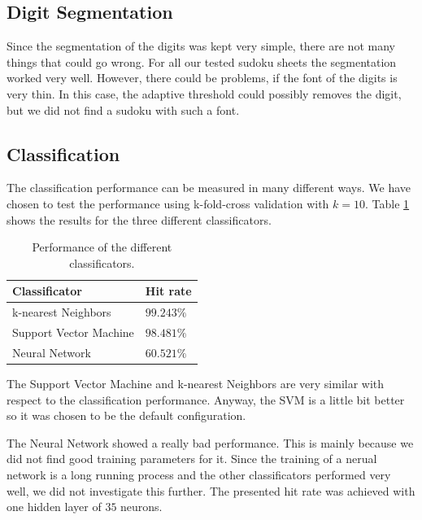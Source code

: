 \documentclass[
a4paper,     %
12pt         %
]{scrartcl}  %
\begin{document}
\subsection{Digit Segmentation}

\label{sec:class_perf}
 
Since the segmentation of the digits was kept very simple, there are not many things that could go
wrong. For all our tested sudoku sheets the segmentation worked very well. However, there could
be problems, if the font of the digits is very thin. In this case, the adaptive threshold could
possibly removes the digit, but we did not find a sudoku with such a font.

\subsection{Classification}

The classification performance can be measured in many different ways. We have chosen to test the
performance using k-fold-cross validation with $k=10$. Table \ref{tab:class_perf} shows the results
for the three different classificators.

\begin{table}
    \centering
    \begin{tabular}{|l|l|}
    \hline
    \textbf{Classificator}          & \textbf{Hit rate}   \\ \hline
    k-nearest Neighbors    & $ 99.243\%$ \\ \hline
    Support Vector Machine & $ 98.481\%$    \\ \hline
    Neural Network         & $ 60.521\%$    \\ \hline
    \end{tabular}
    \caption{Performance of the different classificators.}
    \label{tab:class_perf}
\end{table}

The Support Vector Machine and k-nearest Neighbors are very similar with respect to the classification
performance. Anyway, the SVM is a little bit better so it was chosen to be the default configuration.

The Neural Network showed a really bad performance. This is mainly because we did not find good training
parameters for it. Since the training of a nerual network is a long running process and the other 
classificators performed very well, we did not investigate this further. The presented hit rate was
achieved with one hidden layer of $35$ neurons.
\end{document}
